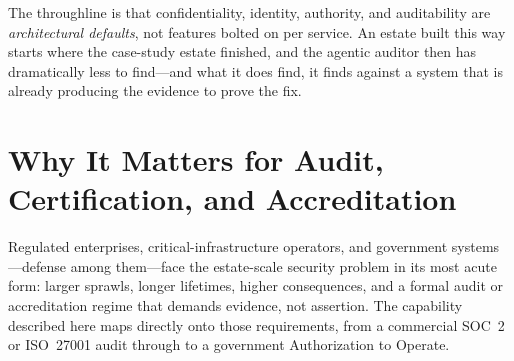 \documentclass[11pt,letterpaper]{article}
\begin{document}
The throughline is that confidentiality, identity, authority, and auditability are
\emph{architectural defaults}, not features bolted on per service. An estate built
this way starts where the case-study estate finished, and the agentic auditor then
has dramatically less to find---and what it does find, it finds against a system
that is already producing the evidence to prove the fix.

\section{Why It Matters for Audit, Certification, and Accreditation}

Regulated enterprises, critical-infrastructure operators, and government
systems---defense among them---face the estate-scale security problem in
its most acute form: larger sprawls, longer lifetimes, higher consequences, and a
formal audit or accreditation regime that demands evidence, not assertion. The
capability described here maps directly onto those requirements, from a commercial
SOC~2 or ISO~27001 audit through to a government Authorization to Operate.
\end{document}
